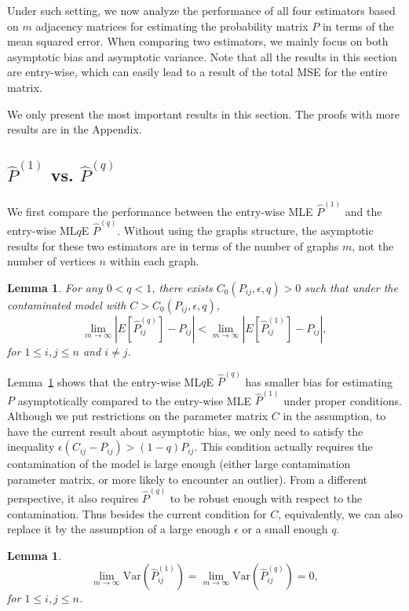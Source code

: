 \documentclass[a4paper]{article}
\newtheorem{lemma}[fact]{Lemma}
\renewcommand{\hat}{\widehat}
\begin{document}
Under such setting, we now analyze the performance of all four estimators based on $m$ adjacency matrices for estimating the probability matrix $P$ in terms of the mean squared error. When comparing two estimators, we mainly focus on both asymptotic bias and asymptotic variance. Note that all the results in this section are entry-wise, which can easily lead to a result of the total MSE for the entire matrix.

We only present the most important results in this section. The proofs with more results are in the Appendix.

\subsection{$\hat{P}^{(1)}$ vs. $\hat{P}^{(q)}$}
\label{section:MLEvsMLqE}
We first compare the performance between the entry-wise MLE $\hat{P}^{(1)}$ and the entry-wise ML$q$E $\hat{P}^{(q)}$. Without using the graphs structure, the asymptotic results for these two estimators are in terms of the number of graphs $m$, not the number of vertices $n$ within each graph.

\begin{lemma}
\label{lemma:ELqlEMLE}
For any $0 < q < 1$, there exists $C_0(P_{ij}, \epsilon, q) > 0$ such that under the contaminated model with $C > C_0(P_{ij}, \epsilon, q)$,
\[
	\lim_{m \to \infty} \left| E[\hat{P}^{(q)}_{ij}] - P_{ij} \right| < 
    \lim_{m \to \infty} \left| E[\hat{P}^{(1)}_{ij}] - P_{ij} \right|,
\]
for $1 \le i, j \le n$ and $i \ne j$.
\end{lemma}

Lemma~\ref{lemma:ELqlEMLE} shows that the entry-wise ML$q$E $\hat{P}^{(q)}$ has smaller bias for estimating $P$ asymptotically compared to the entry-wise MLE $\hat{P}^{(1)}$ under proper conditions. Although we put restrictions on the parameter matrix $C$ in the assumption, to have the current result about asymptotic bias, we only need to satisfy the inequality $\epsilon (C_{ij} - P_{ij}) > (1 - q) P_{ij}$. This condition actually requires the contamination of the model is large enough (either large contamination parameter matrix, or more likely to encounter an outlier). From a different perspective, it also requires $\hat{P}^{(q)}$ to be robust enough with respect to the contamination. Thus besides the current condition for $C$, equivalently, we can also replace it by the assumption of a large enough $\epsilon$ or a small enough $q$.

\begin{lemma}
\label{lemma:VarLqlVarMLE}
\[
	\lim_{m \to \infty} \mathrm{Var}(\hat{P}^{(1)}_{ij})
    = \lim_{m \to \infty} \mathrm{Var}(\hat{P}^{(q)}_{ij}) = 0,
\]
for $1 \le i, j \le n$.
\end{lemma}
\end{document}
